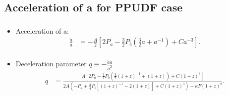 \documentclass{beamer}
\newcommand{\brac}[1]{\left(#1\right)}
\newcommand{\bracc}[1]{\left[#1\right]}
\begin{document}
{\begin{frame}
\end{frame}

\subsection{Acceleration of a for PPUDF case}
\begin{frame}
\frametitle{\insertsectionhead}
\framesubtitle{\insertsubsectionhead}
\fontsize{8pt}{7.2}\selectfont
\begin{itemize}
\item Acceleration of a:
\fontsize{6pt}{7.2}\selectfont
\begin{equation}\label{eq:RayUDF}
\begin{split}
\frac{\ddot{a}}{a} &= -\frac{A}{2}\bracc{2P_{a}-\frac{3}{2}P_{b}\brac{\frac{3}{2}a+a^{-1}}+Ca^{-3}}.\\
\end{split}
\end{equation}
\fontsize{8pt}{7.2}\selectfont
\item Deceleration parameter $q\equiv-\frac{\ddot{a}a}{\dot{a}^{2}}$
\fontsize{6pt}{7.2}\selectfont
\begin{equation}\label{eq:UDFq}
\begin{split}
q &= \frac{A\bracc{2P_{a}-\frac{3}{2}P_{b}\brac{\frac{3}{2}\brac{1+z}^{-1}+\brac{1+z}}+C\brac{1+z}^{3}}}{2A\brac{-P_{a}+\frac{3}{4}P_{b}\bracc{\brac{1+z}^{-1}-2\brac{1+z}}+C\brac{1+z}^{3}} -\kappa F \brac{1+z}^{2}}.        \\
\end{split}
\end{equation}
\end{itemize}


\end{frame}}
\end{document}
